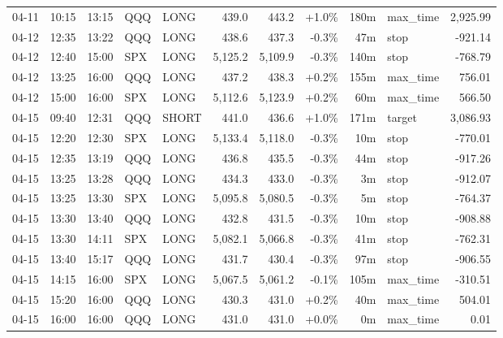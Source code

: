 \documentclass[11pt,a4paper,twoside]{article}
\begin{document}
\begin{center}
\begin{longtable}{>{\color{txtmain}}l l l l l r r r r >{\color{txtmain}}l r}
04-11 & 10:15 & 13:15 & QQQ & LONG & 439.0 & 443.2 & \textcolor{wingreen}{+1.0\%} & 180m & max\_time & \textcolor{wingreen}{2,925.99} \\
04-12 & 12:35 & 13:22 & QQQ & LONG & 438.6 & 437.3 & \textcolor{lossred}{-0.3\%} & 47m & stop & \textcolor{lossred}{-921.14} \\
04-12 & 12:40 & 15:00 & SPX & LONG & 5,125.2 & 5,109.9 & \textcolor{lossred}{-0.3\%} & 140m & stop & \textcolor{lossred}{-768.79} \\
04-12 & 13:25 & 16:00 & QQQ & LONG & 437.2 & 438.3 & \textcolor{wingreen}{+0.2\%} & 155m & max\_time & \textcolor{wingreen}{756.01} \\
04-12 & 15:00 & 16:00 & SPX & LONG & 5,112.6 & 5,123.9 & \textcolor{wingreen}{+0.2\%} & 60m & max\_time & \textcolor{wingreen}{566.50} \\
04-15 & 09:40 & 12:31 & QQQ & SHORT & 441.0 & 436.6 & \textcolor{wingreen}{+1.0\%} & 171m & target & \textcolor{wingreen}{3,086.93} \\
04-15 & 12:20 & 12:30 & SPX & LONG & 5,133.4 & 5,118.0 & \textcolor{lossred}{-0.3\%} & 10m & stop & \textcolor{lossred}{-770.01} \\
04-15 & 12:35 & 13:19 & QQQ & LONG & 436.8 & 435.5 & \textcolor{lossred}{-0.3\%} & 44m & stop & \textcolor{lossred}{-917.26} \\
04-15 & 13:25 & 13:28 & QQQ & LONG & 434.3 & 433.0 & \textcolor{lossred}{-0.3\%} & 3m & stop & \textcolor{lossred}{-912.07} \\
04-15 & 13:25 & 13:30 & SPX & LONG & 5,095.8 & 5,080.5 & \textcolor{lossred}{-0.3\%} & 5m & stop & \textcolor{lossred}{-764.37} \\
04-15 & 13:30 & 13:40 & QQQ & LONG & 432.8 & 431.5 & \textcolor{lossred}{-0.3\%} & 10m & stop & \textcolor{lossred}{-908.88} \\
04-15 & 13:30 & 14:11 & SPX & LONG & 5,082.1 & 5,066.8 & \textcolor{lossred}{-0.3\%} & 41m & stop & \textcolor{lossred}{-762.31} \\
04-15 & 13:40 & 15:17 & QQQ & LONG & 431.7 & 430.4 & \textcolor{lossred}{-0.3\%} & 97m & stop & \textcolor{lossred}{-906.55} \\
04-15 & 14:15 & 16:00 & SPX & LONG & 5,067.5 & 5,061.2 & \textcolor{lossred}{-0.1\%} & 105m & max\_time & \textcolor{lossred}{-310.51} \\
04-15 & 15:20 & 16:00 & QQQ & LONG & 430.3 & 431.0 & \textcolor{wingreen}{+0.2\%} & 40m & max\_time & \textcolor{wingreen}{504.01} \\
04-15 & 16:00 & 16:00 & QQQ & LONG & 431.0 & 431.0 & \textcolor{wingreen}{+0.0\%} & 0m & max\_time & \textcolor{wingreen}{0.01} \\

\end{longtable}
\end{center}
\end{document}
